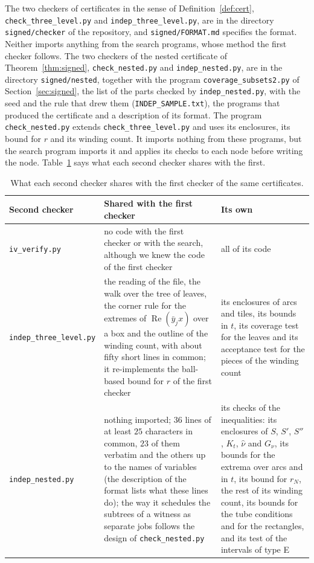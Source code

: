 \documentclass[11pt]{amsart}
\theoremstyle{definition}
\theoremstyle{remark}
\numberwithin{equation}{section}
\newcommand{\re}{\operatorname{Re}}
\newcommand{\SecondCheckerName}{\texttt{indep\_three\_level.py}}
\begin{document}
The two checkers of certificates in the sense of Definition~\ref{def:cert}, \texttt{check\_three\_level.py} and \SecondCheckerName, are in the directory \texttt{signed/checker} of the repository, and \texttt{signed/FORMAT.md} specifies the format. Neither imports anything from the search programs, whose method the first checker follows. The two checkers of the nested certificate of Theorem~\ref{thm:signed}, \texttt{check\_nested.py} and \texttt{indep\_nested.py}, are in the directory \texttt{signed/nested}, together with the program \texttt{coverage\_subsets2.py} of Section~\ref{sec:signed}, the list of the parts checked by \texttt{indep\_nested.py}, with the seed and the rule that drew them (\texttt{INDEP\_SAMPLE.txt}), the programs that produced the certificate and a description of its format. The program \texttt{check\_nested.py} extends \texttt{check\_three\_level.py} and uses its enclosures, its bound for $r$ and its winding count. It imports nothing from these programs, but the search program imports it and applies its checks to each node before writing the node.{} Table~\ref{tab:shared} says what each second checker shares with the first.

\begin{table}[ht]
\centering
\caption{What each second checker shares with the first checker of the same certificates.}\label{tab:shared}
\small
\begin{tabular}{@{}p{}p{}p{}@{}}
\toprule
Second checker & Shared with the first checker & Its own\\
\midrule
\texttt{iv\_verify.py} & no code with the first checker or with the search, although we knew the code of the first checker & all of its code\\
\SecondCheckerName & the reading of the file, the walk over the tree of leaves, the corner rule for the extremes of $\re(\bar y_jx)$ over a box and the outline of the winding count, with about fifty short lines in common; it re-implements the ball-based bound for $r$ of the first checker & its enclosures of arcs and tiles, its bounds in $t$, its coverage test for the leaves and its acceptance test for the pieces of the winding count\\
\texttt{indep\_nested.py} & nothing imported; $36$ lines of at least $25$ characters in common, $23$ of them verbatim and the others up to the names of variables (the description of the format lists what these lines do); the way it schedules the subtrees of a witness as separate jobs follows the design of \texttt{check\_nested.py} & its checks of the inequalities: its enclosures of $S$, $S'$, $S''$, $K_t$, $\hat\nu$ and $G_\nu$, its bounds for the extrema over arcs and in $t$, its bound for $r_N$, the rest of its winding count, its bounds for the tube conditions and for the rectangles, and its test of the intervals of type E\\
\bottomrule
\end{tabular}
\end{table}
\end{document}

